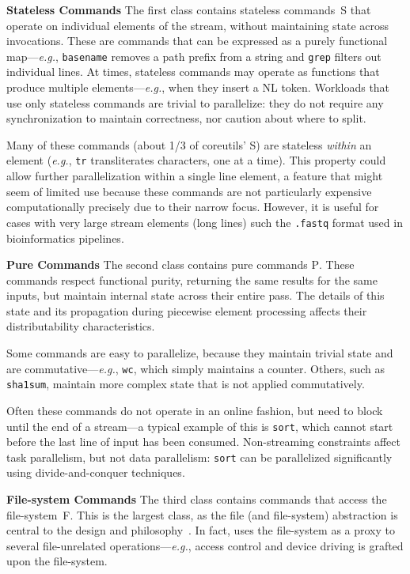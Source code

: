 \documentclass[sigplan,10pt,review,anonymous]{acmart}
\newcommand{\eg}{{\em e.g.}, }
\newcommand{\heading}[1]{\vspace{4pt}\noindent\textbf{#1}\enspace}
\newcommand{\ttt}[1]{\texttt{\small #1}}
\newcommand{\cn}[1]{\mbox{\textcircled{\footnotesize #1}}}
\newcommand{\pur}{\cn{\textsc{P}}\xspace}
\newcommand{\sta}{\cn{\textsc{S}}\xspace}
\newcommand{\dfs}{\cn{\textsc{F}}\xspace}
\begin{document}

\heading{Stateless Commands}
The first class contains stateless commands~\sta that operate on individual elements of the stream, without maintaining state across invocations.
These are commands that can be expressed as a purely functional map---\eg \ttt{basename} removes a path prefix from a string and \ttt{grep} filters out individual lines.
At times, stateless commands may operate as functions that produce multiple elements---\eg when they insert a {\sc NL} token.
Workloads that use only stateless commands are trivial to parallelize:
  they do not require any synchronization to maintain correctness, nor caution about where to split.

Many of these commands (about 1/3 of coreutils' \sta) are stateless \emph{within} an element (\eg \ttt{tr} transliterates characters, one at a time).
This property could allow further parallelization within a single line element, a feature that might seem of limited use because these commands are not particularly expensive computationally precisely due to their narrow focus.
However, it is useful for cases with very large stream elements (long lines) such the \ttt{.fastq} format used in bioinformatics pipelines.

\heading{Pure Commands}
The second class contains pure commands \pur.
These commands respect functional purity, returning the same results for the same inputs, but maintain internal state across their entire pass.
The details of this state and its propagation during piecewise element processing affects their distributability characteristics.

Some commands are easy to parallelize, because they maintain trivial state and are commutative---\eg \ttt{wc}, which simply maintains a counter.
Others, such as \ttt{sha1sum}, maintain more complex state that is not applied commutatively.

Often these commands do not operate in an online fashion, but need to block until the end of a stream---a typical example of this is \ttt{sort}, which cannot start before the last line of input has been consumed.
Non-streaming constraints affect task parallelism, but not data parallelism:
  \ttt{sort} can be parallelized significantly using divide-and-conquer techniques.

\heading{File-system Commands}
The third class contains commands that access the file-system~\dfs.
This is the largest class, as the file (and file-system) abstraction is central to the \unix design and philosophy~\cite{unix}.
In fact, \unix uses the file-system as a proxy to several file-unrelated operations---\eg access control and device driving is grafted upon the file-system.
\end{document}
